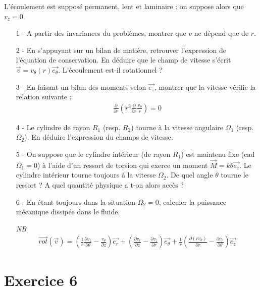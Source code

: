 \documentclass{report}
\begin{document}
L'écoulement est supposé permanent, lent et laminaire : on suppose alors que $v_z=0$.

\begin{itemize}
	\item[1 - ] A partir des invariances du problèmes, montrer que $v$ ne dépend que de $r$.

	\item[2 - ] En s'appuyant sur un bilan de matière, retrouver l'expression de l'équation de conservation. En déduire que le champ de vitesse s'écrit $\vec{v}=v_\theta (r)\vec{e_\theta}$. L'écoulement est-il rotationnel ?
	
	\item[3 - ] En faisant un bilan des moments selon $\vec{e_z}$, montrer que la vitesse vérifie la relation suivante : 
	\begin{align*}
		\frac{\partial}{\partial r}\left(r^3 \frac{\partial}{\partial r}\frac{v_\theta}{r} \right) =0
	\end{align*}
	
	\item[4 - ] Le cylindre de rayon $R_1$ (resp. $R_2$) tourne à la vitesse angulaire $\Omega_1$ (resp. $\Omega_2$). En déduire l'expression du champs de vitesse. 
	
	\item[5 - ] On suppose que le cylindre intérieur (de rayon $R_1$) est maintenu fixe (cad $\Omega_1=0$) à l'aide d'un ressort de torsion qui exerce un moment $\vec{M}=k\theta\vec{e_z}$. Le cylindre intérieur tourne toujours à la vitesse $\Omega_2$. De quel angle $\theta$ tourne le ressort ? A quel quantité physique a t-on alors accès ?
	
	\item[6 - ] En étant toujours dans la situation $\Omega_2=0$, calculer la puissance mécanique dissipée dans le fluide.
	
\textit{NB} 
\begin{align*}
	\vec{rot}(\vec{v})=\left( \frac{1}{r}\frac{\partial v_z}{\partial\theta}-\frac{v_\theta}{\partial z}\right)\vec{e_r} + \left( \frac{\partial v_r}{\partial z}-\frac{\partial v_z}{\partial r}\right)\vec{e_\theta} + \frac{1}{r}\left( \frac{\partial (rv_\theta)}{\partial r}-\frac{\partial v_r}{\partial \theta}\right)\vec{e_z} 
\end{align*}	
	
\end{itemize}

\newpage

\section*{Exercice 6}
\end{document}
